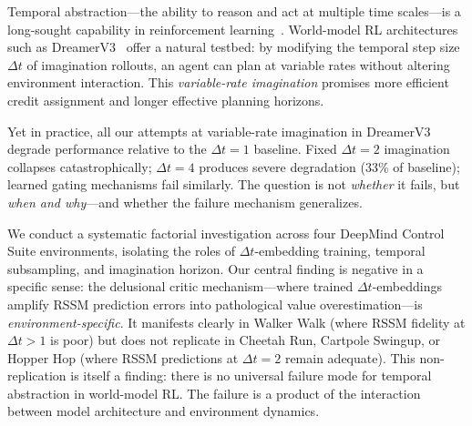 \documentclass[10pt,letterpaper]{article}
\begin{document}
Temporal abstraction---the ability to reason and act at multiple time scales---is a long-sought capability in reinforcement learning~\citep{sutton1999between,precup2000temporal}. World-model RL architectures such as DreamerV3~\citep{hafner2023mastering} offer a natural testbed: by modifying the temporal step size $\Delta t$ of imagination rollouts, an agent can plan at variable rates without altering environment interaction. This \emph{variable-rate imagination} promises more efficient credit assignment and longer effective planning horizons.

Yet in practice, all our attempts at variable-rate imagination in DreamerV3 degrade performance relative to the $\Delta t{=}1$ baseline. Fixed $\Delta t{=}2$ imagination collapses catastrophically; $\Delta t{=}4$ produces severe degradation (33\% of baseline); learned gating mechanisms fail similarly. The question is not \emph{whether} it fails, but \emph{when and why}---and whether the failure mechanism generalizes.

We conduct a systematic factorial investigation across four DeepMind Control Suite environments, isolating the roles of $\Delta t$-embedding training, temporal subsampling, and imagination horizon. Our central finding is negative in a specific sense: the delusional critic mechanism---where trained $\Delta t$-embeddings amplify RSSM prediction errors into pathological value overestimation---is \emph{environment-specific}. It manifests clearly in Walker Walk (where RSSM fidelity at $\Delta t{>}1$ is poor) but does not replicate in Cheetah Run, Cartpole Swingup, or Hopper Hop (where RSSM predictions at $\Delta t{=}2$ remain adequate). This non-replication is itself a finding: there is no universal failure mode for temporal abstraction in world-model RL. The failure is a product of the interaction between model architecture and environment dynamics.
\end{document}
